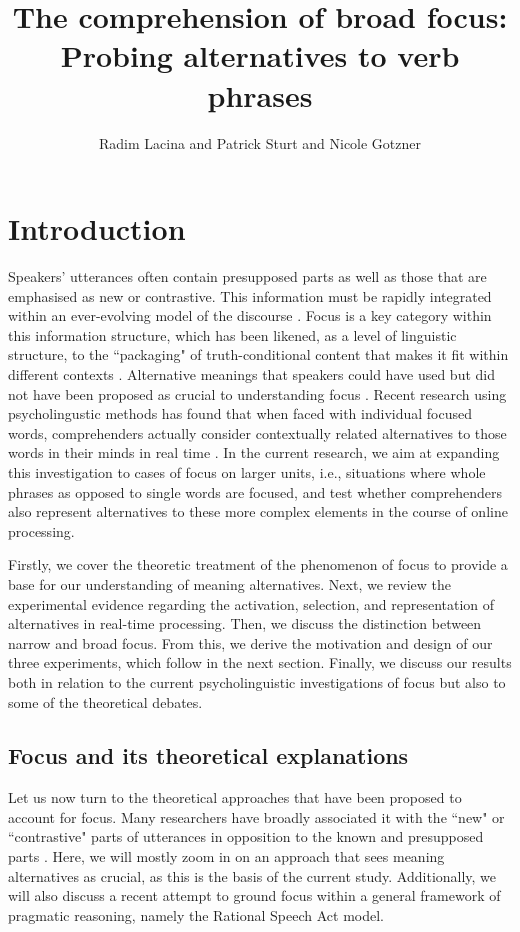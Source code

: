\documentclass[output=paper,colorlinks,citecolor=brown]{langscibook}
\author{Radim Lacina\orcid{0000-0002-7534-6204}\affiliation{Osnabrück University} and Patrick Sturt\orcid{0000-0002-2055-6933}\affiliation{University of Edinburgh} and Nicole Gotzner\orcid{0000-0002-9584-4518}\affiliation{Osnabrück University}}
\title{The comprehension of broad focus: Probing alternatives to verb phrases}
\begin{document}
\maketitle

\section{Introduction} 

Speakers’ utterances often contain presupposed parts as well as those that are emphasised as new or contrastive. This information must be rapidly integrated within an ever-evolving model of the discourse \citep{johnson1983mental}. Focus is a key category within this information structure, which has been likened, as a level of linguistic structure, to the ``packaging" of truth-conditional content that makes it fit within different contexts \citep{Chafe76}. Alternative meanings that speakers could have used but did not have been proposed as crucial to understanding focus \citep{Krifka2008}. Recent research using psycholingustic methods has found that when faced with individual focused words, comprehenders actually consider contextually related alternatives to those words in their minds in real time \citep{braun2010role,husband2016role,gotzner2019life}. In the current research, we aim at expanding this investigation to cases of focus on larger units, i.e., situations where whole phrases as opposed to single words are focused, and test whether comprehenders also represent alternatives to these more complex elements in the course of online processing.

Firstly, we cover the theoretic treatment of the phenomenon of focus to provide a base for our understanding of meaning alternatives. Next, we review the experimental evidence regarding the activation, selection, and representation of alternatives in real-time processing. Then, we discuss the distinction between narrow and broad focus. From this, we derive the motivation and design of our three experiments, which follow in the next section. Finally, we discuss our results both in relation to the current psycholinguistic investigations of focus but also to some of the theoretical debates.

\subsection{Focus and its theoretical explanations}
Let us now turn to the theoretical approaches that have been proposed to account for focus. Many researchers have broadly associated it with the ``new" or ``contrastive" parts of utterances in opposition to the known and presupposed parts \citep{Halliday1967Intonation,jackendoff1972semantic,sgall-hajicova-benesova73,SgallPanevova1986}. Here, we will mostly zoom in on an approach that sees meaning alternatives as crucial, as this is the basis of the current study. Additionally, we will also discuss a recent attempt to ground focus within a general framework of pragmatic reasoning, namely the Rational Speech Act model.
\end{document}
